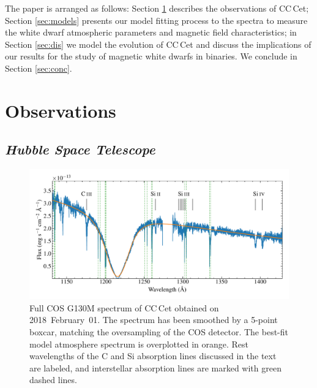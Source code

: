 \documentclass[fleqn,usenatbib]{mnras}
\begin{document}
The paper is arranged as follows: Section \ref{sec:obs} describes the observations of CC\,Cet; Section \ref{sec:models} presents our model fitting process to the spectra to measure the white dwarf atmospheric parameters and magnetic field characteristics; in Section \ref{sec:dis} we model the evolution of CC\,Cet and discuss the implications of our results for the study of magnetic white dwarfs in binaries. We conclude in Section \ref{sec:conc}.   

\section{Observations}
\label{sec:obs}
\subsection{\textit{Hubble Space Telescope}}

\begin{figure}
    \centering
    \includegraphics[width=2\columnwidth]{cc_cet_cos.pdf}
    \caption{Full COS G130M spectrum of CC\,Cet obtained on 2018~February~01. The spectrum has been smoothed by a 5-point boxcar, matching the 
    oversampling 
    of the COS detector. The best-fit model atmosphere spectrum is overplotted in orange. Rest wavelengths of the C and Si absorption lines discussed in the text are labeled, and interstellar absorption lines are marked with green dashed lines.}
    \label{fig:cos_spec}
\end{figure}
\end{document}
